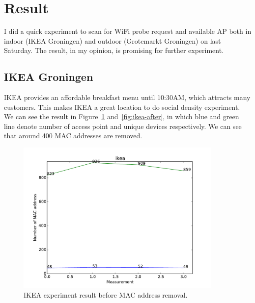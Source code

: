 \documentclass{article}
\begin{document}


\section{Result} %
\label{sec:result}
I did a quick experiment to scan for WiFi probe request and available AP both in indoor (IKEA Groningen) and outdoor (Grotemarkt Groningen) on last Saturday. The result, in my opinion, is promising for further experiment.

\subsection{IKEA Groningen} %
\label{sub:ikea_groningen}
IKEA provides an affordable breakfast menu until 10:30AM, which attracts many customers. This makes IKEA a great location to do social density experiment. We can see the result in Figure~\ref{fig:ikea-before} and~\ref{fig:ikea-after}, in which blue and green line denote number of access point and unique devices respectively. We can see that around 400 MAC addresses are removed. 

\begin{figure}[H]
	\centering
	\includegraphics[width=0.9\textwidth]{./ikea-before.pdf}
	\caption{IKEA experiment result before MAC address removal. }
	\label{fig:ikea-before}
\end{figure}
\end{document}

